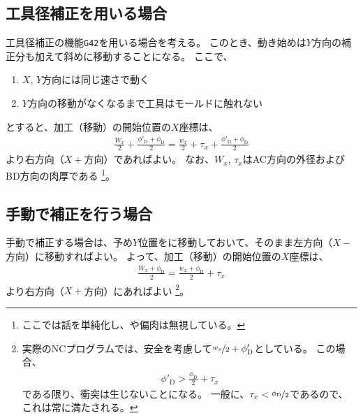 \subsection{工具径補正を用いる場合}
工具径補正の機能\verb|G42|を用いる場合を考える。
このとき、動き始めは$Y$方向の補正分も加えて斜めに移動することになる。
ここで、
\begin{enumerate}[label=\sarrow]
\item $X$, $Y$方向には同じ速さで動く
\item $Y$方向の移動がなくなるまで工具はモールドに触れない
\end{enumerate}
とすると、加工（移動）の開始位置の$X$座標は、
\begin{align*}
  \frac{W_x}2+\frac{\phi'_\mathrm D+\phi_\mathrm D}2
  = \frac{w_x}2+\tau_x+\frac{\phi'_\mathrm D+\phi_\mathrm D}2
\end{align*}
より右方向（$X+$方向）であればよい。
なお、$W_x$, $\tau_x$はAC方向の外径およびBD方向の肉厚である
\footnote{ここでは話を単純化し、\PlatingThk や偏肉は無視している。}。


\clearpage
\subsection{手動で補正を行う場合}
手動で補正する場合は、予め$Y$位置をに移動しておいて、そのまま左方向（$X-$方向）に移動すればよい。
よって、加工（移動）の開始位置の$X$座標は、
\begin{align*}
  \frac{W_x+\phi_\mathrm D}2 = \frac{w_x+\phi_\mathrm D}2+\tau_x
\end{align*}
より右方向（$X+$方向）にあればよい
\footnote{実際のNCプログラムでは、安全を考慮して$\nicefrac{w_x}2+\phi'_\mathrm D$としている。
この場合、
\begin{align*}
  \phi'_\mathrm D > \frac{\phi_\mathrm D}2+\tau_x
\end{align*}
である限り、衝突は生じないことになる。
一般に、$\tau_x < \nicefrac{\phi_\mathrm D}2$であるので、これは常に満たされる。}。

